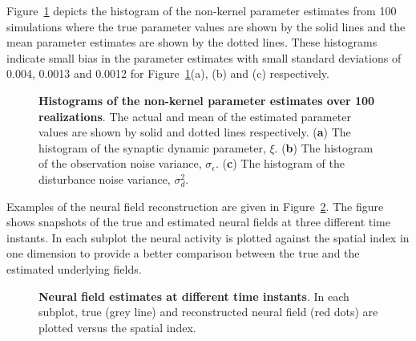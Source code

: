 \documentclass[]{article}
\begin{document}
Figure~\ref{fig:EM-Histogram} depicts the histogram of the non-kernel parameter estimates from 100 simulations where the true parameter values are shown by the solid lines and the mean parameter estimates are shown by the dotted lines. These histograms indicate small bias in the parameter estimates with small standard deviations of 0.004, 0.0013 and 0.0012 for Figure~\ref{fig:EM-Histogram}(a), (b) and (c) respectively.
\begin{figure}[!ht]
\centering
{}
\caption{{\bf Histograms of the non-kernel parameter estimates over 100 realizations}. The actual and mean of the estimated parameter values are shown by solid and dotted lines respectively. (\textbf{a}) The histogram of the synaptic dynamic parameter, $\xi$. (\textbf{b}) The histogram of the observation noise variance, $\sigma_{\epsilon}$. (\textbf{c}) The histogram of the disturbance noise variance, $\sigma_d^2$.}
\label{fig:EM-Histogram}
\end{figure}
Examples of the neural field reconstruction are given in Figure~\ref{fig:FieldEstimates}. The figure shows snapshots of the true and estimated neural fields at three different time instants. In each subplot the neural activity is plotted against the spatial index in one dimension to provide a better comparison between the true and the estimated underlying fields. 
\begin{figure}[!ht]
\centering
{}
\caption{{\bf Neural field estimates at different time instants}. In each subplot, true (grey line) and reconstructed neural field (red dots) are plotted versus the spatial index.}
\label{fig:FieldEstimates}
\end{figure}
\end{document}
